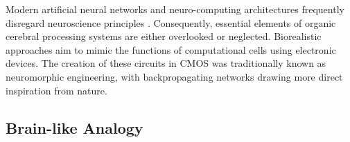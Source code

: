 
\noindent Modern artificial neural networks and neuro-computing architectures frequently disregard neuroscience principles \cite{pfeiffer2018deep}. Consequently, essential elements of organic cerebral processing systems are either overlooked or neglected. Biorealistic approaches aim to mimic the functions of computational cells using electronic devices. The creation of these circuits in CMOS was traditionally known as neuromorphic engineering, with backpropagating networks drawing more direct inspiration from nature.

\subsection[Brain-like Analogy]{Brain-like Analogy}




